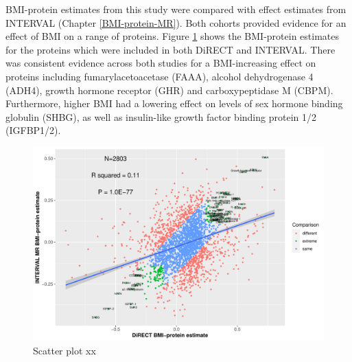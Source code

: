 \documentclass[11pt,twoside]{bristolthesis}
\newcommand{\blandscape}{\begin{landscape}}
\newcommand{\elandscape}{\end{landscape}}
\begin{document}
BMI-protein estimates from this study were compared with effect estimates from INTERVAL (Chapter \ref{BMI-protein-MR}). Both cohorts provided evidence for an effect of BMI on a range of proteins. Figure \ref{fig:DiRECT-INTERVAL} shows the BMI-protein estimates for the proteins which were included in both DiRECT and INTERVAL. There was consistent evidence across both studies for a BMI-increasing effect on proteins including fumarylacetoacetase (FAAA), alcohol dehydrogenase 4 (ADH4), growth hormone receptor (GHR) and carboxypeptidase M (CBPM). Furthermore, higher BMI had a lowering effect on levels of sex hormone binding globulin (SHBG), as well as insulin-like growth factor binding protein 1/2 (IGFBP1/2).

\blandscape



\begin{figure}
\includegraphics{figure/DiRECT/DiRECT_INTERVAL_comparison} \caption[Scatter plot]{Scatter plot xx}\label{fig:DiRECT-INTERVAL}
\end{figure}
\elandscape
\end{document}
